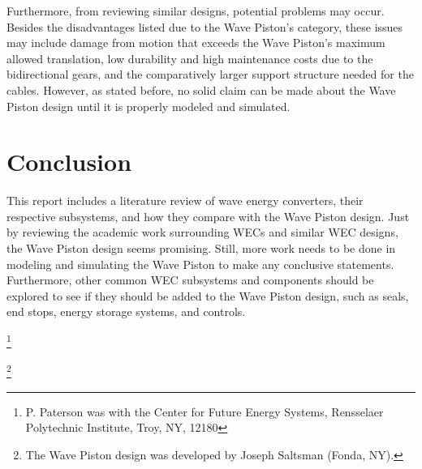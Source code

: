 \documentclass[journal]{IEEEtran}
\begin{document}
Furthermore, from reviewing similar designs, potential problems may occur. Besides the disadvantages listed due to the Wave Piston's category, these issues may include damage from motion that exceeds the Wave Piston's maximum allowed translation, low durability and high maintenance costs due to the bidirectional gears, and the comparatively larger support structure needed for the cables. However, as stated before, no solid claim can be made about the Wave Piston design until it is properly modeled and simulated.

\section{Conclusion}
This report includes a literature review of wave energy converters, their respective subsystems, and how they compare with the Wave Piston design. Just by reviewing the academic work surrounding WECs and similar WEC designs, the Wave Piston design seems promising. Still, more work needs to be done in modeling and simulating the Wave Piston to make any conclusive statements. Furthermore, other common WEC subsystems and components should be explored to see if they should be added to the Wave Piston design, such as seals, end stops, energy storage systems, and controls\cite{osti_1897711}. 


\thanks{P. Paterson was with the Center for Future Energy Systems, Rensselaer Polytechnic Institute, Troy, NY, 12180}%

\thanks{The Wave Piston design was developed by Joseph Saltsman (Fonda, NY).}%
\end{document}
